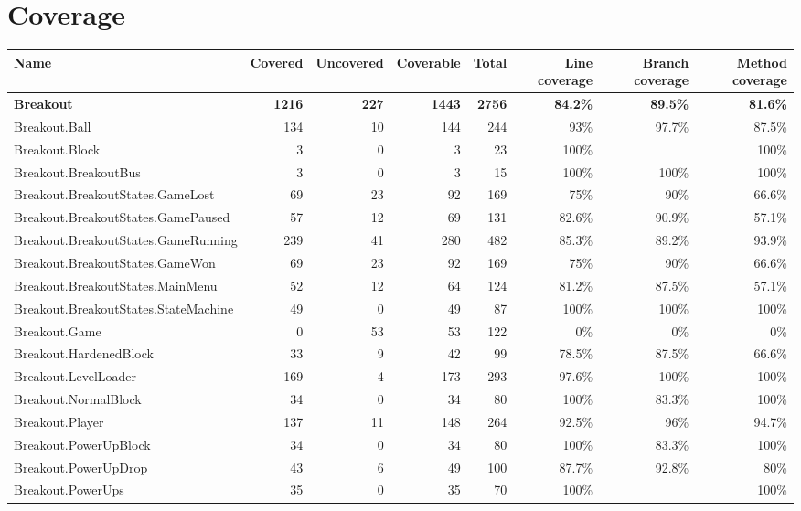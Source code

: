 \documentclass[a4paper,landscape,10pt]{article}
\begin{document}
\section{Coverage}
\begin{longtable}[l]{|l|r|r|r|r|r|r|r|}
\hline
\textbf{Name} & \textbf{Covered} & \textbf{Uncovered} & \textbf{Coverable} & \textbf{Total} & \textbf{Line coverage} & \textbf{Branch coverage} & \textbf{Method coverage}\\
\hline
\textbf{Breakout} & \textbf{1216} & \textbf{227} & \textbf{1443} & \textbf{2756} & \textbf{84.2\%} & \textbf{89.5\%} & \textbf{81.6\%}\\
\hline
Breakout.Ball & 134 & 10 & 144 & 244 & 93\% & 97.7\% & 87.5\%\\
\hline
Breakout.Block & 3 & 0 & 3 & 23 & 100\% &  & 100\%\\
\hline
Breakout.BreakoutBus & 3 & 0 & 3 & 15 & 100\% & 100\% & 100\%\\
\hline
Breakout.BreakoutStates.GameLost & 69 & 23 & 92 & 169 & 75\% & 90\% & 66.6\%\\
\hline
Breakout.BreakoutStates.GamePaused & 57 & 12 & 69 & 131 & 82.6\% & 90.9\% & 57.1\%\\
\hline
Breakout.BreakoutStates.GameRunning & 239 & 41 & 280 & 482 & 85.3\% & 89.2\% & 93.9\%\\
\hline
Breakout.BreakoutStates.GameWon & 69 & 23 & 92 & 169 & 75\% & 90\% & 66.6\%\\
\hline
Breakout.BreakoutStates.MainMenu & 52 & 12 & 64 & 124 & 81.2\% & 87.5\% & 57.1\%\\
\hline
Breakout.BreakoutStates.StateMachine & 49 & 0 & 49 & 87 & 100\% & 100\% & 100\%\\
\hline
Breakout.Game & 0 & 53 & 53 & 122 & 0\% & 0\% & 0\%\\
\hline
Breakout.HardenedBlock & 33 & 9 & 42 & 99 & 78.5\% & 87.5\% & 66.6\%\\
\hline
Breakout.LevelLoader & 169 & 4 & 173 & 293 & 97.6\% & 100\% & 100\%\\
\hline
Breakout.NormalBlock & 34 & 0 & 34 & 80 & 100\% & 83.3\% & 100\%\\
\hline
Breakout.Player & 137 & 11 & 148 & 264 & 92.5\% & 96\% & 94.7\%\\
\hline
Breakout.PowerUpBlock & 34 & 0 & 34 & 80 & 100\% & 83.3\% & 100\%\\
\hline
Breakout.PowerUpDrop & 43 & 6 & 49 & 100 & 87.7\% & 92.8\% & 80\%\\
\hline
Breakout.PowerUps & 35 & 0 & 35 & 70 & 100\% &  & 100\%\\

\end{longtable}
\end{document}
